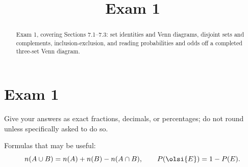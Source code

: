 \documentclass[12pt]{ximera}
\title{Exam 1}
\begin{document}
\begin{abstract}
Exam 1, covering Sections 7.1--7.3: set identities and Venn diagrams,
disjoint sets and complements, inclusion-exclusion, and reading probabilities and
odds off a completed three-set Venn diagram.
\end{abstract}
\maketitle

\section*{Exam 1}

Give your answers as exact fractions, decimals, or percentages; do not round unless
specifically asked to do so.

Formulas that may be useful:
\[
n(A\cup B) = n(A) + n(B) - n(A\cap B), \qquad
P\!\left(\olsi{E}\right)=1-P(E).
\]
\end{document}
